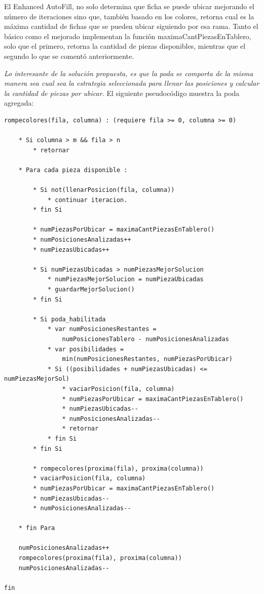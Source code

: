 \documentclass[11pt,a4paper]{article}
\begin{document}
El Enhanced AutoFill, no solo determina que ficha se puede ubicar mejorando el número de iteraciones sino que, también basado en los colores, retorna cual es la máxima cantidad de fichas que se pueden ubicar siguiendo por esa rama. Tanto el básico como el mejorado implementan la función maximaCantPiezasEnTablero, solo que el primero, retorna la cantidad de piezas disponibles, mientras que el segundo lo que se comentó anteriormente.

\textit{Lo interesante de la solución propuesta, es que la poda se comporta de la misma manera sea cual sea la estrategia seleccionada para llenar las posiciones y calcular la cantidad de piezas por ubicar.
}
El siguiente pseudocódigo muestra la poda agregada:

\begin{Verbatim}[commandchars=\\\{\}]
rompecolores(fila, columna) : (requiere fila >= 0, columna >= 0)

	* Si columna > m && fila > n
		* retornar
	
	* Para cada pieza disponible :

		* Si not(llenarPosicion(fila, columna))
			* continuar iteracion.
		* fin Si

		* numPiezasPorUbicar = maximaCantPiezasEnTablero()
		* numPosicionesAnalizadas++
		* numPiezasUbicadas++

		* Si numPiezasUbicadas > numPiezasMejorSolucion
			* numPiezasMejorSolucion = numPiezaUbicadas
			* guardarMejorSolucion()
		* fin Si

		* Si poda_habilitada
			* var numPosicionesRestantes =
				numPosicionesTablero - numPosicionesAnalizadas
			* var posibilidades =
				min(numPosicionesRestantes, numPiezasPorUbicar)
			* Si ((posibilidades + numPiezasUbicadas) <= numPiezasMejorSol)
				* vaciarPosicion(fila, columna)
				* numPiezasPorUbicar = maximaCantPiezasEnTablero()
				* numPiezasUbicadas--
				* numPosicionesAnalizadas--
				* retornar
			* fin Si
		* fin Si	

		* rompecolores(proxima(fila), proxima(columna))
		* vaciarPosicion(fila, columna)
		* numPiezasPorUbicar = maximaCantPiezasEnTablero()
		* numPiezasUbicadas--
		* numPosicionesAnalizadas--

	* fin Para
	
	numPosicionesAnalizadas++	
	rompecolores(proxima(fila), proxima(columna))
	numPosicionesAnalizadas--

fin
\end{Verbatim}
\end{document}
